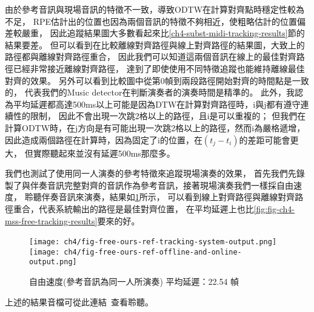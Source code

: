 \documentclass[class=NCU_thesis, crop=false]{standalone}
\begin{document}
由於參考音訊與現場音訊的特徵不一致，導致ODTW在計算對齊點時穩定性較為不足，
RPE估計出的位置也因為兩個音訊的特徵不夠相近，使粗略估計的位置偏差較嚴重，
因此追蹤結果圖大多數看起來比\ref{ch4-subst-midi-tracking-results}節的結果要差。
但可以看到在比較離線對齊路徑與線上對齊路徑的結果圖，大致上的路徑都與離線對齊路徑重合，
因此我們可以知道這兩個音訊在線上的最佳對齊路徑已經非常接近離線對齊路徑，
達到了即使使用不同特徵追蹤也能維持離線最佳對齊的效果。
另外可以看到比較圖中從第0幀到兩段路徑開始對齊的時間點是一致的，
代表我們的Music detector在判斷演奏者的演奏時間是精準的。
此外，我認為平均延遲都高達500ms以上可能是因為DTW在計算對齊路徑時，i與j都有遵守連續性的限制，
因此不會出現一次跳2格以上的路徑，且i是可以重複的；
但我們在計算ODTW時，在j方向是有可能出現一次跳2格以上的路徑，然而i為嚴格遞增，
因此造成兩個路徑在計算時，因為固定了i的位置，在$(t_j-t_i)$的差距可能會更大，
但實際聽起來並沒有延遲500ms那麼多。

我們也測試了使用同一人演奏的參考特徵來追蹤現場演奏的效果，
首先我們先錄製了與伴奏音訊完整對齊的音訊作為參考音訊，接著現場演奏我們一樣採自由速度，
聆聽伴奏音訊來演奏，結果如\cref{fig:fig-ch4-free-ours-ref-tracking-results}所示，
可以看到線上對齊路徑與離線對齊路徑重合，代表系統輸出的路徑是最佳對齊位置，
在平均延遲上也比\cref{fig:fig-ch4-mss-free-tracking-results}要來的好。

\begin{figure}[H]
    \centering
    \subcaptionbox
    {
    \label{fig:free-ours-ref-tracking-output}}
    {\texttt{[image: ch4/fig-free-ours-ref-tracking-system-output.png]}}
    ~
    \subcaptionbox
    {
    \label{fig:free-ours-ref-comparision-output}}
    {\texttt{[image: ch4/fig-free-ours-ref-offline-and-online-output.png]}}
    \caption{自由速度(參考音訊為同一人所演奏) 平均延遲：22.54 幀}
    \label{fig:fig-ch4-free-ours-ref-tracking-results}
\end{figure}



上述的結果音檔可從此連結~\cite{YuJieLin2024DiffFeatureTrackingResults}查看聆聽。

\pagebreak
\end{document}
